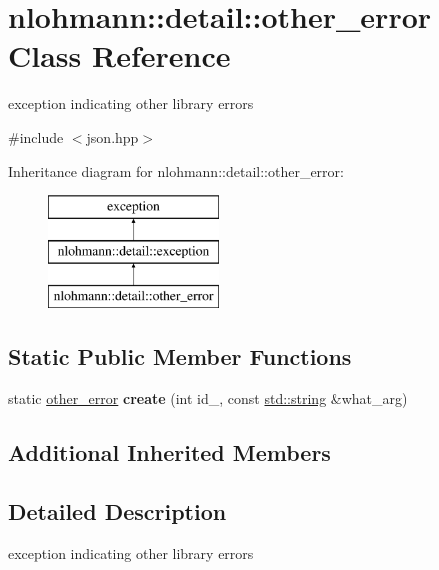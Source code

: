 \hypertarget{classnlohmann_1_1detail_1_1other__error}{}\section{nlohmann\+:\+:detail\+:\+:other\+\_\+error Class Reference}
\label{classnlohmann_1_1detail_1_1other__error}


exception indicating other library errors  




{\ttfamily \#include $<$json.\+hpp$>$}

Inheritance diagram for nlohmann\+:\+:detail\+:\+:other\+\_\+error\+:\begin{figure}[H]
\begin{center}
\leavevmode
\includegraphics[height=3.000000cm]{d5/d1b/classnlohmann_1_1detail_1_1other__error}
\end{center}
\end{figure}
\subsection*{Static Public Member Functions}
\begin{DoxyCompactItemize}
\item 
\mbox{\label{classnlohmann_1_1detail_1_1other__error_a87e8ab894e8c85c0d97a0919782d3683}} 
static \mbox{\hyperlink{classnlohmann_1_1detail_1_1other__error}{other\+\_\+error}} {\bfseries create} (int id\+\_\+, const \mbox{\hyperlink{namespacenlohmann_1_1detail_a90aa5ef615aa8305e9ea20d8a947980fab45cffe084dd3d20d928bee85e7b0f21}{std\+::string}} \&what\+\_\+arg)
\end{DoxyCompactItemize}
\subsection*{Additional Inherited Members}


\subsection{Detailed Description}
exception indicating other library errors 

